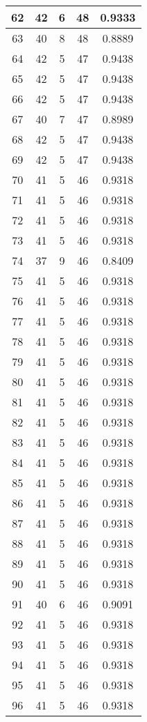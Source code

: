 \documentclass[letterpaper, 12pt]{article}
\begin{document}
\begin{longtable}{|c|c|c|c|c|}
\hline
62 & 42 & 6 & 48 & 0.9333 \\
\hline
63 & 40 & 8 & 48 & 0.8889 \\
\hline
64 & 42 & 5 & 47 & 0.9438 \\
\hline
65 & 42 & 5 & 47 & 0.9438 \\
\hline
66 & 42 & 5 & 47 & 0.9438 \\
\hline
67 & 40 & 7 & 47 & 0.8989 \\
\hline
68 & 42 & 5 & 47 & 0.9438 \\
\hline
69 & 42 & 5 & 47 & 0.9438 \\
\hline
70 & 41 & 5 & 46 & 0.9318 \\
\hline
71 & 41 & 5 & 46 & 0.9318 \\
\hline
72 & 41 & 5 & 46 & 0.9318 \\
\hline
73 & 41 & 5 & 46 & 0.9318 \\
\hline
74 & 37 & 9 & 46 & 0.8409 \\
\hline
75 & 41 & 5 & 46 & 0.9318 \\
\hline
76 & 41 & 5 & 46 & 0.9318 \\
\hline
77 & 41 & 5 & 46 & 0.9318 \\
\hline
78 & 41 & 5 & 46 & 0.9318 \\
\hline
79 & 41 & 5 & 46 & 0.9318 \\
\hline
80 & 41 & 5 & 46 & 0.9318 \\
\hline
81 & 41 & 5 & 46 & 0.9318 \\
\hline
82 & 41 & 5 & 46 & 0.9318 \\
\hline
83 & 41 & 5 & 46 & 0.9318 \\
\hline
84 & 41 & 5 & 46 & 0.9318 \\
\hline
85 & 41 & 5 & 46 & 0.9318 \\
\hline
86 & 41 & 5 & 46 & 0.9318 \\
\hline
87 & 41 & 5 & 46 & 0.9318 \\
\hline
88 & 41 & 5 & 46 & 0.9318 \\
\hline
89 & 41 & 5 & 46 & 0.9318 \\
\hline
90 & 41 & 5 & 46 & 0.9318 \\
\hline
91 & 40 & 6 & 46 & 0.9091 \\
\hline
92 & 41 & 5 & 46 & 0.9318 \\
\hline
93 & 41 & 5 & 46 & 0.9318 \\
\hline
94 & 41 & 5 & 46 & 0.9318 \\
\hline
95 & 41 & 5 & 46 & 0.9318 \\
\hline
96 & 41 & 5 & 46 & 0.9318 \\

\end{longtable}
\end{document}
